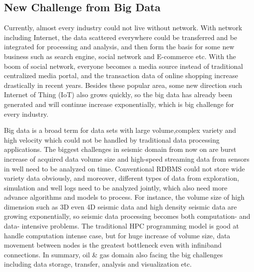 \subsection{New Challenge from Big Data}
Currently, almost every industry could not live without network. With network including Internet, the data scattered everywhere could be transferred and be integrated for processing and analysis, and then form the basis for some new business such as search engine, social network and E-commerce etc. With the boom of social network, everyone becomes a media source instead of traditional centralized media portal, and the transaction data of online shopping increase drastically in recent years. Besides these popular area, some new direction such Internet of Thing (IoT) also grows quickly, so the big data has already been generated and will continue increase exponentially, which is big challenge for every industry.    

Big data \cite{WikiBigData} is a broad term for data sets with large volume,complex variety and high velocity which could not be handled by traditional data processing applications. The biggest challenges in seismic domain from now on are burst increase of acquired data volume size and high-speed streaming data from sensors in well need to be analyzed on time. Conventional RDBMS could not store wide variety data obviously, and moreover, different types of data from exploration, simulation and well logs need to be analyzed jointly, which also need more advance algorithms and models to process. For instance, the volume size of high dimension such as 3D even 4D seismic data and high density seismic data are growing exponentially, so seismic data processing becomes both computation- and data- intensive problems. The traditional HPC programming model is good at handle computation intense case, but for huge increase of volume size, data movement between nodes is the greatest bottleneck even with infiniband connections. In summary, oil \& gas domain also facing the big challenges including data storage, transfer, analysis and visualization etc.

